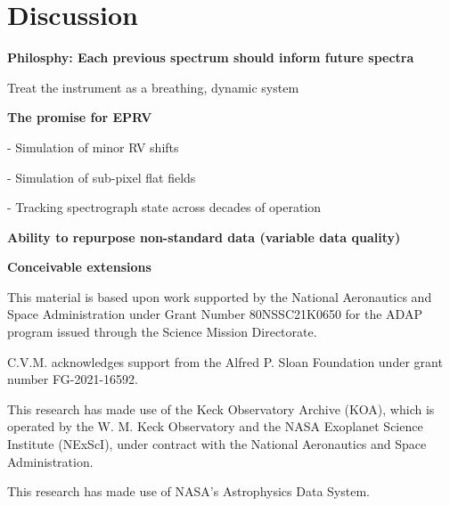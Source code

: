 \documentclass[twocolumn]{aastex631}
\begin{document}
\pagebreak
\clearpage

\section{Discussion}\label{secDiscuss}

\begin{mdframed}
  \textbf{Philosphy: Each previous spectrum should inform future spectra} \par
  Treat the instrument as a breathing, dynamic system\par
  \textcolor{lightgray}{\lipsum[5]}
\end{mdframed}

\begin{mdframed}
  \textbf{The promise for EPRV} \par
  - Simulation of minor RV shifts\par
  - Simulation of sub-pixel flat fields \par
  - Tracking spectrograph state across decades of operation\par
  \textcolor{lightgray}{\lipsum[14]}
\end{mdframed}


\begin{mdframed}
  \textbf{Ability to repurpose non-standard data (variable data quality)} \par
  \textcolor{lightgray}{\lipsum[15]}
\end{mdframed}


\begin{mdframed}
  \textbf{Conceivable extensions} \par
  \textcolor{lightgray}{\lipsum[16]}
\end{mdframed}



\begin{acknowledgements}
  This material is based upon work supported by the National Aeronautics and Space Administration under Grant Number 80NSSC21K0650 for the ADAP program issued through the Science Mission Directorate.

  C.V.M. acknowledges support from the Alfred P. Sloan Foundation under grant number FG-2021-16592.

  This research has made use of the Keck Observatory Archive (KOA), which is operated by the W. M. Keck Observatory and the NASA Exoplanet Science Institute (NExScI), under contract with the National Aeronautics and Space Administration.

  This research has made use of NASA's Astrophysics Data System.
\end{acknowledgements}
\end{document}
